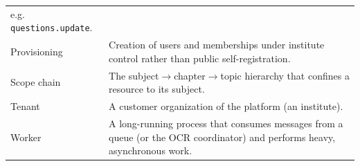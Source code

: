 \begin{center}
\begin{longtable}{@{}p{3.9cm}p{10.2cm}@{}}
e.g. \texttt{questions.update}. \\
Provisioning & Creation of users and memberships under institute control rather
than public self-registration. \\
Scope chain & The subject$\rightarrow$chapter$\rightarrow$topic hierarchy that
confines a resource to its subject. \\
Tenant & A customer organization of the platform (an institute). \\
Worker & A long-running process that consumes messages from a queue (or the OCR
coordinator) and performs heavy, asynchronous work. \\
\bottomrule
\end{longtable}
\end{center}